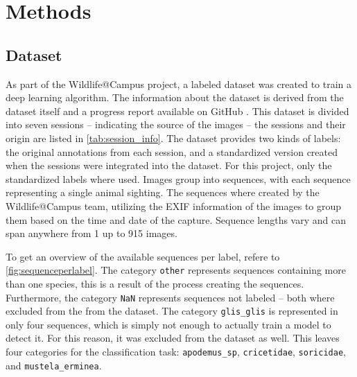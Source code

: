 

\section{Methods}
\label{methods}

    \subsection{Dataset}

    As part of the Wildlife@Campus project, a labeled dataset was created to train a deep learning algorithm.
    The information about the dataset is derived from the dataset itself and a progress report available on GitHub \autocite{ratnaweeraWildlifeCampusProgressReports2021}.
    This dataset is divided into seven sessions -- indicating the source of the images -- the sessions and their origin are listed in \autoref{tab:session_info}.
    The dataset provides two kinds of labels: the original annotations from each session, and a standardized version created when the sessions were integrated into the dataset.
    For this project, only the standardized labels where used.
    Images group into sequences, with each sequence representing a single animal sighting.
    The sequences where created by the Wildlife@Campus team, utilizing the EXIF information of the images to group them based on the time and date of the capture.
    Sequence lengths vary and can span anywhere from 1 up to 915 images.
    
    To get an overview of the available sequences per label, refere to \autoref{fig:sequenceperlabel}.
    The category \texttt{other} represents sequences containing more than one species, this is a result of the process creating the sequences.
    Furthermore, the category \texttt{NaN} represents sequences not labeled -- both where excluded from the from the dataset.
    The category \texttt{glis\_glis} is represented in only four sequences, which is simply not enough to actually train a model to detect it.
    For this reason, it was excluded from the dataset as well.
    This leaves four categories for the classification task: \texttt{apodemus\_sp}, \texttt{cricetidae}, \texttt{soricidae}, and \texttt{mustela\_erminea}.

